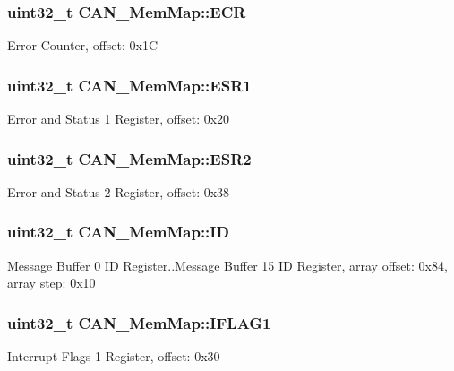 \subsubsection[{E\+C\+R}]{\setlength{\rightskip}{0pt plus 5cm}uint32\+\_\+t C\+A\+N\+\_\+\+Mem\+Map\+::\+E\+C\+R}\label{struct_c_a_n___mem_map_ae333e3fdb5adc42d26fa7a9b9c2014f4}
Error Counter, offset\+: 0x1\+C \hypertarget{struct_c_a_n___mem_map_a22b3d30edd2510d48809119a334deb5c}{}
\subsubsection[{E\+S\+R1}]{\setlength{\rightskip}{0pt plus 5cm}uint32\+\_\+t C\+A\+N\+\_\+\+Mem\+Map\+::\+E\+S\+R1}\label{struct_c_a_n___mem_map_a22b3d30edd2510d48809119a334deb5c}
Error and Status 1 Register, offset\+: 0x20 \hypertarget{struct_c_a_n___mem_map_ac28986f6535a563a5790cdde8b507166}{}
\subsubsection[{E\+S\+R2}]{\setlength{\rightskip}{0pt plus 5cm}uint32\+\_\+t C\+A\+N\+\_\+\+Mem\+Map\+::\+E\+S\+R2}\label{struct_c_a_n___mem_map_ac28986f6535a563a5790cdde8b507166}
Error and Status 2 Register, offset\+: 0x38 \hypertarget{struct_c_a_n___mem_map_a974cc9d286388361bc15ab95bc264671}{}
\subsubsection[{I\+D}]{\setlength{\rightskip}{0pt plus 5cm}uint32\+\_\+t C\+A\+N\+\_\+\+Mem\+Map\+::\+I\+D}\label{struct_c_a_n___mem_map_a974cc9d286388361bc15ab95bc264671}
Message Buffer 0 I\+D Register..Message Buffer 15 I\+D Register, array offset\+: 0x84, array step\+: 0x10 \hypertarget{struct_c_a_n___mem_map_a9a4fc7f05bf39e47ce0bd8842a49ce2f}{}
\subsubsection[{I\+F\+L\+A\+G1}]{\setlength{\rightskip}{0pt plus 5cm}uint32\+\_\+t C\+A\+N\+\_\+\+Mem\+Map\+::\+I\+F\+L\+A\+G1}\label{struct_c_a_n___mem_map_a9a4fc7f05bf39e47ce0bd8842a49ce2f}
Interrupt Flags 1 Register, offset\+: 0x30 \hypertarget{struct_c_a_n___mem_map_aa06064731318366c51bc3ee552491070}{}
